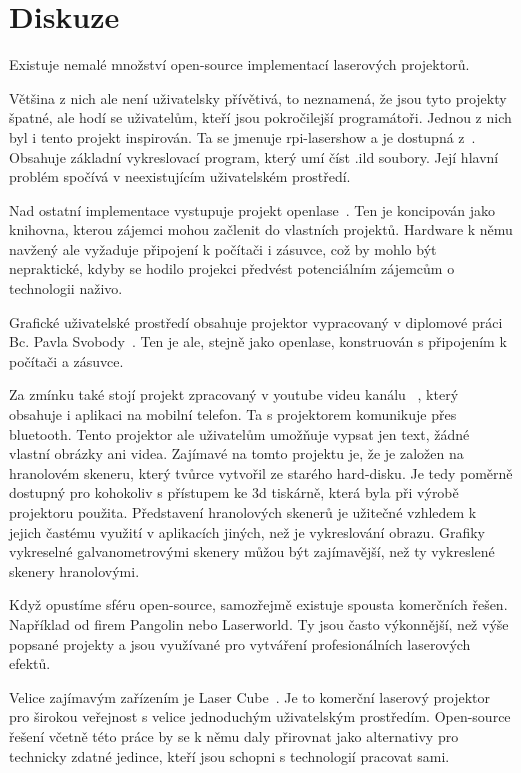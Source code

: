 \chapter{Diskuze}

Existuje nemalé množství open-source implementací laserových projektorů.

Většina z nich ale není uživatelsky přívětivá, to neznamená, že jsou tyto projekty špatné, ale hodí se uživatelům, kteří jsou pokročilejší programátoři. 
Jednou z nich byl i tento projekt inspirován.
Ta se jmenuje rpi-lasershow a je dostupná z~\cite{rpi-lasershow}. Obsahuje základní vykreslovací program, který umí číst .ild soubory. Její hlavní problém spočívá v neexistujícím uživatelském prostředí.

Nad ostatní implementace vystupuje projekt openlase~\cite{openlase}. Ten je koncipován jako knihovna, kterou zájemci mohou začlenit do vlastních projektů.
Hardware k němu navžený ale vyžaduje připojení k počítači i zásuvce, což by mohlo být nepraktické, kdyby se hodilo projekci předvést potenciálním zájemcům o technologii naživo.

Grafické uživatelské prostředí obsahuje projektor vypracovaný v diplomové práci Bc. Pavla Svobody~\cite{vut-chabr}. Ten je ale, stejně jako openlase, konstruován s připojením k počítači a zásuvce.

Za zmínku také stojí projekt zpracovaný v youtube videu kanálu ~\cite{harddrive-projector-youtube}, který obsahuje i aplikaci na mobilní telefon. Ta s projektorem komunikuje přes bluetooth. Tento projektor ale uživatelům umožňuje vypsat jen text, žádné vlastní obrázky ani videa.
Zajímavé na tomto projektu je, že je založen na hranolovém skeneru, který tvůrce vytvořil ze starého hard-disku. Je tedy poměrně dostupný pro kohokoliv s přístupem ke 3d tiskárně, která byla při výrobě projektoru použita.
Představení hranolových skenerů je užitečné vzhledem k jejich častému využití v aplikacích jiných, než je vykreslování obrazu. Grafiky vykreselné galvanometrovými skenery můžou být zajímavější, než ty vykreslené skenery hranolovými.

Když opustíme sféru open-source, samozřejmě existuje spousta komerčních řešen. Například od firem Pangolin nebo Laserworld. Ty jsou často výkonnější, než výše popsané projekty a jsou využívané pro vytváření profesionálních laserových efektů.

Velice zajímavým zařízením je Laser Cube~\cite{lasercube}. Je to komerční laserový projektor pro širokou veřejnost s velice jednoduchým uživatelským prostředím. Open-source řešení včetně této práce by se k němu daly přirovnat jako alternativy pro technicky zdatné jedince, kteří jsou schopni s technologií pracovat sami.
